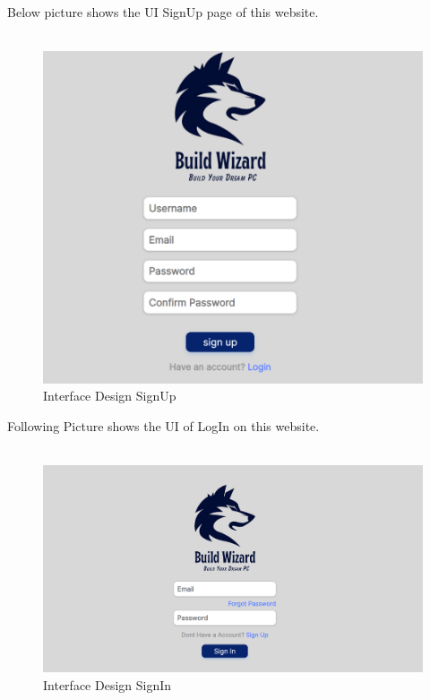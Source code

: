       \newpage
      Below picture shows the UI SignUp page of this website.\\\\
      \begin{figure}[H]
      \includegraphics[width=15cm]{Diagrams/UISIGNUP.png}
      \caption{Interface Design SignUp}
      \end{figure}
      \newpage
      Following Picture shows the UI of LogIn on this website.\\\\
      \begin{figure}[H]
      \includegraphics[width=15cm]{Diagrams/UILOGIN.png}
      \caption{Interface Design SignIn}
      \end{figure}
